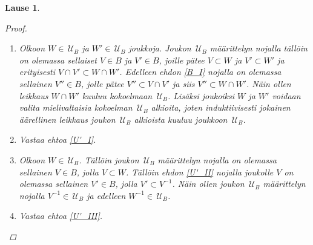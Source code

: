 \documentclass[12pt,a4paper,leqno]{report}
\newcommand{\U}{\,\mathcal{U}}
\theoremstyle{plain}
\newtheorem{lause}[equation]{Lause}
\theoremstyle{definition}
\theoremstyle{remark}
\begin{document}
\begin{lause}
\begin{proof}
\begin{enumerate}
Toisaalta jos osajoukolle $W'\subset X\times X$ pätee $V\subset W \subset W'$, 
niin $W'\in\U_B$. \\
Siis jos $W\in \U_B$ ja $W\subset W'\subset X\times X$ niin $ W'\in\U_B$.
\item[\ref{F_II}] Olkoon $W\in\U_B$ ja $W'\in\U_B$ joukkoja. 
Joukon $\U_B$ määrittelyn nojalla tällöin on olemassa 
sellaiset $V\in B$ ja $V'\in B$, 
joille pätee $V\subset W$ ja $V'\subset W'$ ja 
erityisesti $V\cap V'\subset W\cap W'$. 
Edelleen ehdon \ref{B_I} nojalla on olemassa sellainen $V''\in B$, 
jolle pätee $V''\subset V\cap V'$ ja siis $V''\subset W\cap W'$. 
Näin ollen leikkaus $W\cap W'$ kuuluu kokoelmaan $\U_B$. 
Lisäksi joukoiksi $W$ ja $W'$ voidaan valita mielivaltaisia kokoelman $\U_B$ alkioita, 
joten induktiivisesti jokainen äärellinen leikkaus joukon $\U_B$ alkioista kuuluu joukkoon $\U_B$.
\item[\ref{U_I}] Vastaa ehtoa \ref{U'_I}.
\item[\ref{U_II}] Olkoon $W\in\U_B$. 
Tällöin joukon $\U_B$ määrittelyn nojalla on olemassa sellainen $V\in B$, 
jolla $V\subset W$. %
Tällöin ehdon \ref{U'_II} nojalla joukolle $V$ on olemassa sellainen $V'\in B$, 
jolla $V'\subset V^{-1}$. 
Näin ollen joukon $\U_B$ määrittelyn nojalla $V^{-1}\in\U_B$ ja 
edelleen $W^{-1}\in\U_B$. 
\item[\ref{U_III}] Vastaa ehtoa \ref{U'_III}.
\end{enumerate}
\end{proof}
\end{lause}
\end{document}
